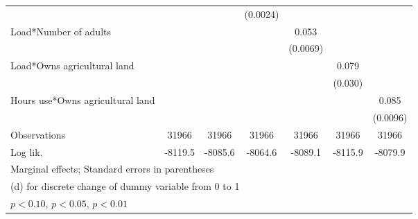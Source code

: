 \begin{table}[htbp]
\begin{tabular*}{1\hsize}{@{\hskip\tabcolsep\extracolsep\fill}l*{6}{c}}
                &                  &                  & (0.0024)         &                  &                  &                  \\
Load*Number of adults&                  &                  &                  &    0.053\sym{***}&                  &                  \\
                &                  &                  &                  & (0.0069)         &                  &                  \\
Load*Owns agricultural land&                  &                  &                  &                  &    0.079\sym{***}&                  \\
                &                  &                  &                  &                  &  (0.030)         &                  \\
Hours use*Owns agricultural land&                  &                  &                  &                  &                  &    0.085\sym{***}\\
                &                  &                  &                  &                  &                  & (0.0096)         \\
\midrule
Observations    &    31966         &    31966         &    31966         &    31966         &    31966         &    31966         \\
Log lik.        &  -8119.5         &  -8085.6         &  -8064.6         &  -8089.1         &  -8115.9         &  -8079.9         \\
\bottomrule
\multicolumn{7}{l}{\footnotesize Marginal effects; Standard errors in parentheses}\\
\multicolumn{7}{l}{\footnotesize  (d) for discrete change of dummy variable from 0 to 1}\\
\multicolumn{7}{l}{\footnotesize \sym{*} \(p<0.10\), \sym{**} \(p<0.05\), \sym{***} \(p<0.01\)}\\
\end{tabular*}
\end{table}
